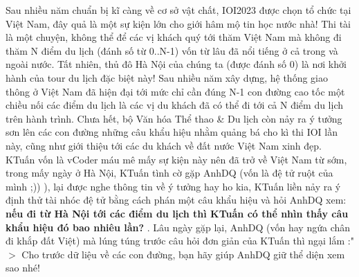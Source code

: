 Sau nhiều năm chuẩn bị kĩ càng về cơ sở vật chất, IOI2023 được chọn tổ chức tại Việt Nam, đây quả là một sự kiện lớn cho giới hâm mộ tin học nước nhà! Thi tài là một chuyện, không thể để các vị khách quý tới thăm Việt Nam mà không đi thăm N điểm du lịch (đánh số từ 0..N-1) vốn từ lâu đã nổi tiếng ở cả trong và ngoài nước. Tất nhiên, thủ đô Hà Nội của chúng ta (được đánh số 0) là nơi khởi hành của tour du lịch đặc biệt này! Sau nhiều năm xây dựng, hệ thống giao thông ở Việt Nam đã hiện đại tới mức chỉ cần đúng N-1 con đường cao tốc một chiều nối các điểm du lịch là các vị du khách đã có thể đi tới cả N điểm du lịch trên hành trình. Chưa hết, bộ Văn hóa Thể thao \& Du lịch còn nảy ra ý tưởng sơn lên các con đường những câu khẩu hiệu nhằm quảng bá cho kì thi IOI lần này, cũng như giới thiệu tới các du khách về đất nước Việt Nam xinh đẹp. KTuấn vốn là vCoder máu mê mấy sự kiện này nên đã trở về Việt Nam từ sớm, trong mấy ngày ở Hà Nội, KTuấn tình cờ gặp AnhDQ (vốn là đệ tử ruột của mình ;)) ), lại được nghe thông tin về ý tưởng hay ho kia, KTuấn liền nảy ra ý định thử tài nhóc đệ tử bằng cách phán một câu khẩu hiệu và hỏi AnhDQ xem:   \textbf{    nếu đi từ Hà Nội tới các điểm du lịch thì KTuấn có thể nhìn thấy câu khẩu hiệu đó bao nhiêu lần?   }   . Lâu ngày gặp lại, AnhDQ (vốn hay ngứa chân đi khắp đất Việt) mà lúng túng trước câu hỏi đơn giản của KTuấn thì ngại lắm :"$>$ Cho trước dữ liệu về các con đường, bạn hãy giúp AnhDQ giữ thể diện xem sao nhé!